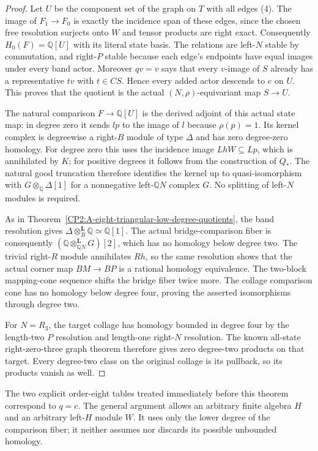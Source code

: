 \begin{proof}
Let $U$ be the component set of the graph on $T$
with all edges (4).
The image of $F_1\to F_0$ is exactly the incidence
span of these edges, since the chosen free resolution
surjects onto $W$ and tensor products are right exact.
Consequently $H_0(F)=\mathbb Q[U]$ with its literal
state basis.
The relations are left-$N$ stable by commutation,
and right-$P$ stable because each edge's endpoints
have equal images under every band actor.
Moreover $qv=v$ says that every $v$-image of $S$
already has a representative $tv$ with $t\in CS$.
Hence every added actor descends to $e$ on $U$.
This proves that the quotient is the actual
$(N,\rho)$-equivariant map $S\to U$.

The natural comparison $F\to\mathbb Q[U]$ is the
derived adjoint of this actual state map: in degree
zero it sends $lp$ to the image of $l$ because
$\rho(p)=1$.
Its kernel complex is degreewise a right-$B$ module
of type $\Delta$ and has zero degree-zero homology.
For degree zero this uses the incidence image
$LhW\subseteq Lp$, which is annihilated by $K$;
for positive degrees it follows from the construction
of $Q_*$.
The natural good truncation therefore identifies
the kernel up to quasi-isomorphism with
$G\otimes_{\mathbb Q}\Delta[1]$ for a nonnegative
left-$\mathbb QN$ complex $G$.
No splitting of left-$N$ modules is required.

As in Theorem~\ref{CP2:A-eight-triangular-low-degree-quotients},
the band resolution gives
$\Delta\otimes_B^{\mathbf L}\mathbb Q\simeq\mathbb Q[1]$.
The actual bridge-comparison fiber is consequently
$(\mathbb Q\otimes_{\mathbb QN}^{\mathbf L}G)[2]$,
which has no homology below degree two.
The trivial right-$R$ module annihilates $Rh$, so
the same resolution shows that the actual corner map
$BM\to BP$ is a rational homology equivalence.
The two-block mapping-cone sequence shifts the bridge
fiber twice more.  The collage comparison cone has
no homology below degree four, proving the asserted
isomorphisms through degree two.

For $N=R_3$, the target collage has homology bounded
in degree four by the length-two $P$ resolution and
length-one right-$N$ resolution.
The known all-state right-zero-three graph theorem
therefore gives zero degree-two products on that
target.  Every degree-two class on the original
collage is its pullback, so its products vanish as well.
\end{proof}

\begin{remark*}
The two explicit order-eight tables treated immediately
before this theorem correspond to $q=c$.
The general argument allows an arbitrary finite algebra
$H$ and an arbitrary left-$H$ module $W$.
It uses only the lower degree of the comparison fiber;
it neither assumes nor discards its possible unbounded
homology.
\end{remark*}
